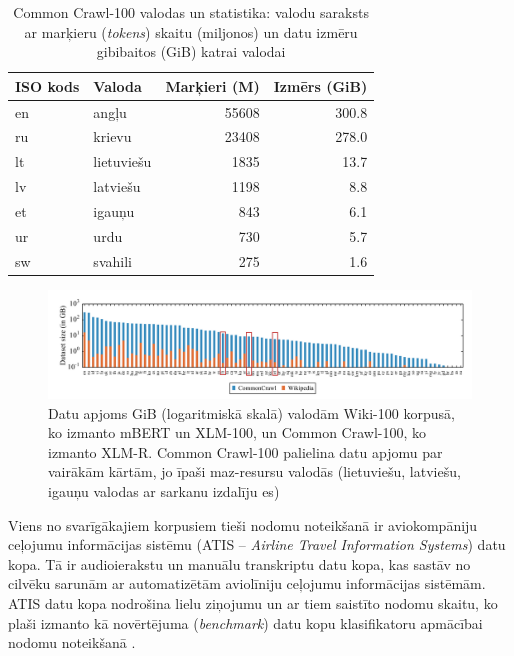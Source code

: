 \begin{table}[htbp]
    \centering
    \caption{Common Crawl-100 valodas un statistika: valodu saraksts ar marķieru (\textit{tokens}) skaitu (miljonos) un datu izmēru gibibaitos (GiB) katrai valodai}
    \begin{tabular}{llrr}
        \toprule
        ISO kods & Valoda     & Marķieri (M) & Izmērs (GiB) \\\midrule
        en       & angļu      & 55608        & 300.8        \\
        ru       & krievu     & 23408        & 278.0        \\
        lt       & lietuviešu & 1835         & 13.7         \\
        lv       & latviešu   & 1198         & 8.8          \\
        et       & igauņu     & 843          & 6.1          \\
        ur       & urdu       & 730          & 5.7          \\
        sw       & svahili    & 275          & 1.6          \\\bottomrule
    \end{tabular}
    \label{tab:cc-100}
\end{table}

\begin{figure}[h]
    \centering
    \includegraphics[width=\textwidth]{figures/dataset-size.png}
    \caption{Datu apjoms GiB (logaritmiskā skalā) valodām Wiki-100 korpusā, ko izmanto mBERT un XLM-100, un Common Crawl-100, ko izmanto XLM-R. Common Crawl-100 palielina datu apjomu par vairākām kārtām, jo īpaši maz-resursu valodās (lietuviešu, latviešu, igauņu valodas ar sarkanu izdalīju es) \cite{conneau2020}}
    \label{fig:dataset-size}
\end{figure}






Viens no svarīgākajiem korpusiem tieši nodomu noteikšanā ir aviokompāniju ceļojumu informācijas sistēmu (ATIS -- \textit{Airline Travel Information Systems}) datu kopa. Tā ir audioierakstu un manuālu transkriptu datu kopa, kas sastāv no cilvēku sarunām ar automatizētām aviolīniju ceļojumu informācijas sistēmām. ATIS datu kopa nodrošina lielu ziņojumu un ar tiem saistīto nodomu skaitu, ko plaši izmanto kā novērtējuma (\textit{benchmark}) datu kopu klasifikatoru apmācībai nodomu noteikšanā \cite{atis1990}.


